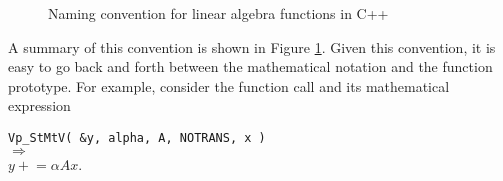 \documentclass[acmtoms,acmnow]{acmtrans2m}
\begin{document}
{\bsinglespace
\begin{figure}
\caption[Naming convention summary table for linear algebra functions]{
\label{rsqppp:tbl:linalgpack_naming_convention}
Naming convention for linear algebra functions in C++
}
\end{figure}
\esinglespace}


A summary of this convention is shown in Figure
{}\ref{rsqppp:tbl:linalgpack_naming_convention}.  Given this
convention, it is easy to go back and forth between the mathematical
notation and the function prototype. For example, consider the
function call and its mathematical expression\\[1.0ex]

{\bsinglespace
\hspace*{4ex}\parbox{\textwidth}{
{}\texttt{Vp\_StMtV( \&y, alpha, A, NOTRANS, x )}\\
$\Longrightarrow$\\
$y +\!= \alpha A x$.
}
\esinglespace}\\[1ex]
\end{document}
